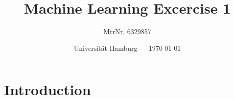 \documentclass{scrartcl}
\title{Machine Learning Excercise 1}
\author{MtrNr. 6329857}
\date{Universität Hamburg --- \today}
\begin{document}
\maketitle

\section*{Introduction}
\end{document}
